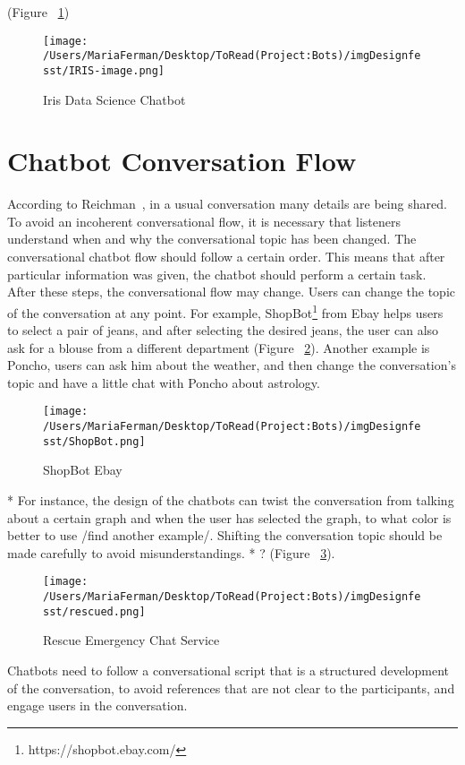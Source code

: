 \documentclass[a4paper,10pt]{article}
\begin{document}
(Figure ~\ref{FigureIRIS})

\begin{figure}
\centering
\texttt{[image: /Users/MariaFerman/Desktop/ToRead(Project:Bots)/imgDesignfesst/IRIS-image.png]}
\caption{Iris Data Science Chatbot}
\label{FigureIRIS}
\end{figure}

\section{Chatbot Conversation Flow}
According to Reichman~\cite{reichman1985getting}, in a usual conversation many details are being shared. To avoid an incoherent conversational flow, it is necessary that listeners understand when and why the conversational topic has been changed. The conversational chatbot flow should follow a certain order. This means that after particular information was given, the chatbot should perform a certain task. After these steps, the conversational flow may change. Users can change the topic of the conversation at any point. For example, ShopBot\footnote{https://shopbot.ebay.com/} from Ebay helps users to select a pair of jeans, and after selecting the desired jeans, the user can also ask for a blouse from a different department (Figure ~\ref{FigureEbay}). %
Another example is Poncho, users can ask him about the weather, and then change the conversation's topic and have a little chat with Poncho about astrology. 

\begin{figure}
\centering
\texttt{[image: /Users/MariaFerman/Desktop/ToRead(Project:Bots)/imgDesignfesst/ShopBot.png]}
\caption{ShopBot Ebay}
\label{FigureEbay}
\end{figure}

* For instance, the design of the chatbots can twist the conversation from talking about a certain graph and when the user has selected the graph, to what color is better to use /find another example/. Shifting the conversation topic should be made carefully to avoid misunderstandings.  * ?
(Figure ~\ref{FigureRescue}).  

\begin{figure}
\centering
\texttt{[image: /Users/MariaFerman/Desktop/ToRead(Project:Bots)/imgDesignfesst/rescued.png]}
\caption{Rescue Emergency Chat Service}
\label{FigureRescue}
\end{figure}

Chatbots need to follow a conversational script that is a structured development of the conversation, to avoid references that are not clear to the participants, and engage users in the conversation.
\end{document}
